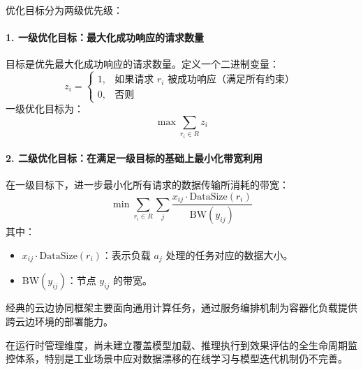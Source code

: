 优化目标分为两级优先级：

\paragraph*{1. 一级优化目标：最大化成功响应的请求数量}

目标是优先最大化成功响应的请求数量。定义一个二进制变量：
\[
z_i = 
\begin{cases} 
1, & \text{如果请求 } r_i \text{ 被成功响应（满足所有约束）} \\
0, & \text{否则}
\end{cases}
\]
一级优化目标为：
\[
\max \sum_{r_i \in R} z_i
\]

\paragraph*{2. 二级优化目标：在满足一级目标的基础上最小化带宽利用}

在一级目标下，进一步最小化所有请求的数据传输所消耗的带宽：
\[
\min \sum_{r_i \in R} \sum_{j} \frac{x_{ij} \cdot \text{DataSize}(r_i)}{\text{BW}(y_{ij})}
\]
其中：
\begin{itemize}
    \item \( x_{ij} \cdot \text{DataSize}(r_i) \)：表示负载 \( a_j \) 处理的任务对应的数据大小。
    \item \( \text{BW}(y_{ij}) \)：节点 \( y_{ij} \) 的带宽。
\end{itemize}

经典的云边协同框架主要面向通用计算任务，通过服务编排机制为容器化负载提供跨云边环境的部署能力。

在运行时管理维度，尚未建立覆盖模型加载、推理执行到效果评估的全生命周期监控体系，特别是工业场景中应对数据漂移的在线学习与模型迭代机制仍不完善。

